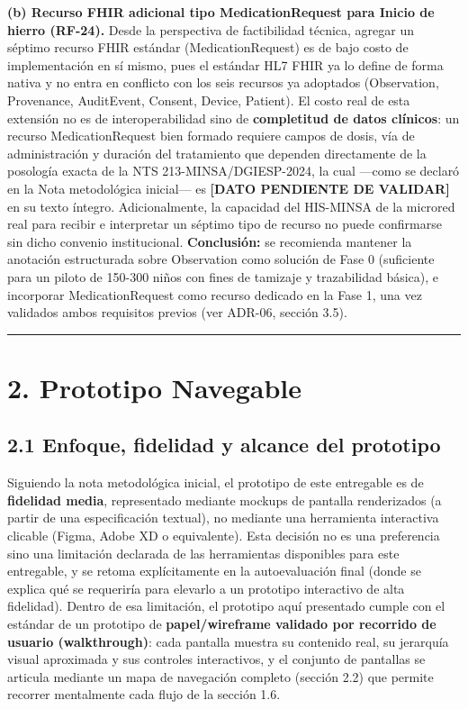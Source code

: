 \documentclass[11pt,a4paper]{article}
\begin{document}
\textbf{(b) Recurso FHIR adicional tipo MedicationRequest para Inicio de hierro (RF-24).} Desde la perspectiva de factibilidad técnica, agregar un séptimo recurso FHIR estándar (MedicationRequest) es de bajo costo de implementación en sí mismo, pues el estándar HL7 FHIR ya lo define de forma nativa y no entra en conflicto con los seis recursos ya adoptados (Observation, Provenance, AuditEvent, Consent, Device, Patient). El costo real de esta extensión no es de interoperabilidad sino de \textbf{completitud de datos clínicos}: un recurso MedicationRequest bien formado requiere campos de dosis, vía de administración y duración del tratamiento que dependen directamente de la posología exacta de la NTS 213-MINSA/DGIESP-2024, la cual ---como se declaró en la Nota metodológica inicial--- es \textbf{{[}DATO PENDIENTE DE VALIDAR{]}} en su texto íntegro. Adicionalmente, la capacidad del HIS-MINSA de la microred real para recibir e interpretar un séptimo tipo de recurso no puede confirmarse sin dicho convenio institucional. \textbf{Conclusión:} se recomienda mantener la anotación estructurada sobre Observation como solución de Fase 0 (suficiente para un piloto de 150-300 niños con fines de tamizaje y trazabilidad básica), e incorporar MedicationRequest como recurso dedicado en la Fase 1, una vez validados ambos requisitos previos (ver ADR-06, sección 3.5).

\begin{center}\rule{0.5\linewidth}{0.5pt}\end{center}

\section{2. Prototipo Navegable}\label{prototipo-navegable}

\subsection{2.1 Enfoque, fidelidad y alcance del prototipo}\label{enfoque-fidelidad-y-alcance-del-prototipo}

Siguiendo la nota metodológica inicial, el prototipo de este entregable es de \textbf{fidelidad media}, representado mediante mockups de pantalla renderizados (a partir de una especificación textual), no mediante una herramienta interactiva clicable (Figma, Adobe XD o equivalente). Esta decisión no es una preferencia sino una limitación declarada de las herramientas disponibles para este entregable, y se retoma explícitamente en la autoevaluación final (donde se explica qué se requeriría para elevarlo a un prototipo interactivo de alta fidelidad). Dentro de esa limitación, el prototipo aquí presentado cumple con el estándar de un prototipo de \textbf{papel/wireframe validado por recorrido de usuario (walkthrough)}: cada pantalla muestra su contenido real, su jerarquía visual aproximada y sus controles interactivos, y el conjunto de pantallas se articula mediante un mapa de navegación completo (sección 2.2) que permite recorrer mentalmente cada flujo de la sección 1.6.
\end{document}
